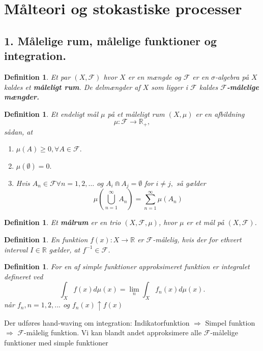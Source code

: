 \documentclass[12pt]{report}
\newtheorem{definition}[lemma]{Definition}
\theoremstyle{break}
\theoremstyle{break}
\newcommand{\RR}{\mathbb{R}}
\newcommand{\FI}{\mathcal{F}}
\newcommand{\1}{\mathds{1}}
\begin{document}
\chapter*{Målteori og stokastiske processer}
\section*{1. Målelige rum, målelige funktioner og integration.}
\begin{definition}
	Et par $(X,\FI)$ hvor $X$ er en mængde og $\FI$ er en $\sigma$-algebra på $X$ kaldes et {\bf måleligt rum}. De delmængder af $X$ som ligger i $\FI$ kaldes  {\bf $\FI$-målelige mængder.}
\end{definition}
\begin{definition}
	Et endeligt mål $\mu$ på et måleligt rum $(X,\mu)$ er en afbildning
	\[\mu \colon \FI \to \RR_+, \]
	sådan, at
	\begin{enumerate}
		\item $ \mu (A) \geq 0, \forall A \in \FI .$
		\item $ \mu(\emptyset)=0. $
		\item Hvis $A_n \in \FI \forall n=1,2,\dots$ og $A_i \Cap A_j = \emptyset$ for $i\neq j,$ så gælder
		\[ \mu \left( \bigcup^\infty_{n=1}A_n \right)=\sum\limits_{n=1}^{\infty}\mu \left( A_n \right) \]
	\end{enumerate}
\end{definition}
\begin{definition}
	Et {\bf målrum} er en trio $(X,\FI,\mu)$, hvor $\mu$ er et mål på $(X,\FI)$.
\end{definition}
\begin{definition}
	En funktion $f(x) \colon X\to \RR$ er $\FI$-målelig, hvis der for ethvert interval $I\in \RR$ gælder, at $f^{-1}\in \FI$.
\end{definition}
\begin{definition}
	For en af simple funktioner approksimeret funktion  er integralet defineret ved
	\[ \int_{X} f(x)d\mu(x)=\lim\limits_{n} \int_{X}f_n(x)d\mu(x).\]
	når $f_n, n=1,2,...$ og $f_n(x)\uparrow f(x)$
\end{definition}

Der udføres hand-waving om integration: Indikatorfunktion $\Rightarrow$ Simpel funktion $\Rightarrow$ $\FI$-målelig funktion. Vi kan blandt andet approksimere alle $\FI$-målelige funktioner med simple funktioner 
\end{document}
